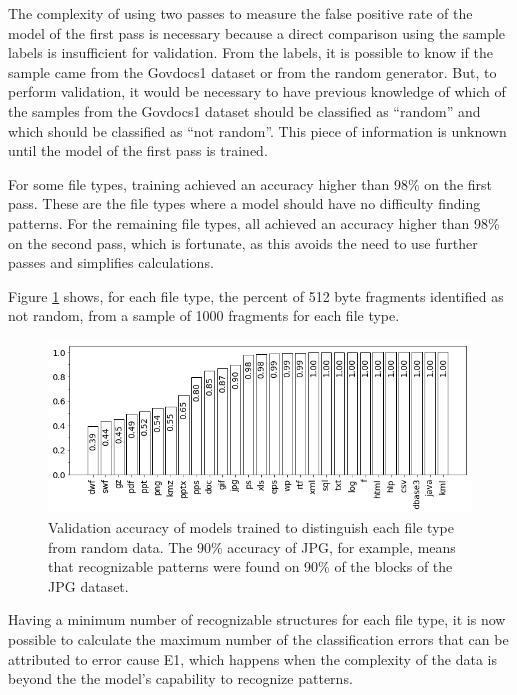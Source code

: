 The complexity of using two passes to measure the false positive rate of the model of the first pass is necessary because a direct comparison using the sample labels is insufficient for validation. From the labels, it is possible to know if the sample came from the Govdocs1 dataset or from the random generator. But, to perform validation, it would be necessary to have previous knowledge of which of the samples from the Govdocs1 dataset should be classified as ``random'' and which should be classified as ``not random''. This piece of information is unknown until the model of the first pass is trained.

For some file types, training achieved an accuracy higher than 98\% on the first pass. These are the file types where a model should have no difficulty finding patterns. For the remaining file types, all achieved an accuracy higher than 98\% on the second pass, which is fortunate, as this avoids the need to use further passes and  simplifies calculations.

Figure \ref{fig:not_random} shows, for each file type, the percent of 512 byte fragments identified as not random, from a sample of 1000 fragments for each file type.

\noindent
\begin{figure}[htb!]
\centering\includegraphics[width=1.0\textwidth]{content/random.png}
\caption{\label{fig:not_random}Validation accuracy of models trained to distinguish each file type from random data. The 90\% accuracy of JPG, for example, means that recognizable patterns were found on 90\% of the blocks of the JPG dataset.}%
\end{figure}

Having a minimum number of recognizable structures for each file type, it is now possible to calculate the maximum number of the classification errors that can be attributed to error cause E1, which happens when the complexity of the data is beyond the the model’s capability to recognize patterns.

